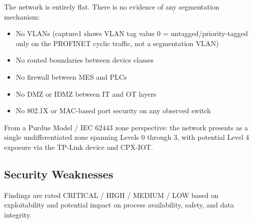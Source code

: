 The network is entirely flat. There is no evidence of any segmentation mechanism:

\begin{itemize}
\item No VLANs (capture1 shows VLAN tag value 0 = untagged/priority-tagged only on the PROFINET cyclic traffic, not a segmentation VLAN)
\item No routed boundaries between device classes
\item No firewall between MES and PLCs
\item No DMZ or IDMZ between IT and OT layers
\item No 802.1X or MAC-based port security on any observed switch
\end{itemize}

From a Purdue Model / IEC 62443 zone perspective: the network presents as a single undifferentiated zone spanning Levels 0 through 3, with potential Level 4 exposure via the TP-Link device and CPX-IOT.

\subsection{Security Weaknesses}

Findings are rated CRITICAL / HIGH / MEDIUM / LOW based on exploitability and potential impact on process availability, safety, and data integrity.

